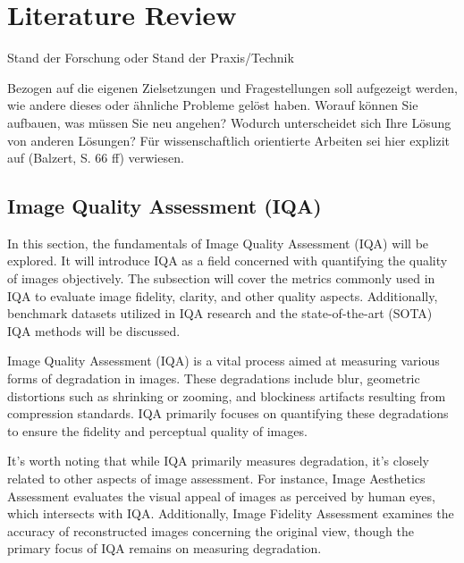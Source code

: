 \chapter{Literature Review}
\label{ch:LiteratureReview}
Stand der Forschung oder Stand der Praxis/Technik

Bezogen auf die eigenen Zielsetzungen und Fragestellungen soll aufgezeigt werden, wie andere dieses oder ähnliche Probleme gelöst haben. Worauf können Sie aufbauen, was müssen Sie neu angehen? Wodurch unterscheidet sich Ihre Lösung von anderen Lösungen? Für wissenschaftlich orientierte Arbeiten sei hier explizit auf (Balzert, S. 66 ff) verwiesen.

\section{Image Quality Assessment (IQA)}
\label{sec:OverviewTeledermatology}
In this section, the fundamentals of Image Quality Assessment (IQA) will be explored. It will introduce IQA as a field concerned with quantifying the quality of images objectively. The subsection will cover the metrics commonly used in IQA to evaluate image fidelity, clarity, and other quality aspects. Additionally, benchmark datasets utilized in IQA research and the state-of-the-art (SOTA) IQA methods will be discussed. \par
\vspace{\baselineskip}
Image Quality Assessment (IQA) is a vital process aimed at measuring various forms of degradation in images. These degradations include blur, geometric distortions such as shrinking or zooming, and blockiness artifacts resulting from compression standards. IQA primarily focuses on quantifying these degradations to ensure the fidelity and perceptual quality of images. \par
\vspace{\baselineskip}
It's worth noting that while IQA primarily measures degradation, it's closely related to other aspects of image assessment. For instance, Image Aesthetics Assessment evaluates the visual appeal of images as perceived by human eyes, which intersects with IQA. Additionally, Image Fidelity Assessment examines the accuracy of reconstructed images concerning the original view, though the primary focus of IQA remains on measuring degradation. \par


